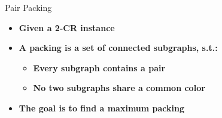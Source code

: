 \begin{frame}{Pair Packing}
\begin{itemize}
\item \textbf<1> 
{Given a 2-CR instance}

\item \textbf<2>
{A packing is a set of connected subgraphs, s.t.:}
	
	\begin{itemize}
	
	\item \textbf<3> 
	{Every subgraph contains a pair}
	
	\item \textbf<4>
	{No two subgraphs share a common color} 
	
	\end{itemize} 

\item \textbf<5>
{The goal is to find a maximum packing}

\end{itemize}


\end{frame}